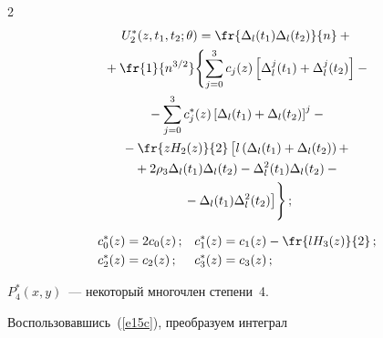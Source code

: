 \begin{multicols}{2}
\begin{multline*}
U_2^*(z,t_1,t_2;\theta)=\fr{\Delta_l(t_1)\Delta_l(t_2)}{n} +{}\\


{}+


        \fr{1}{n^{3/2}} \Biggl\{


        \sum_{j=0}^3 c_j(z)


        \left[\Delta_l^j(t_1)+\Delta_l^j(t_2)\right]-


{}\\


{}  -\sum_{j=0}^3 c_j^*(z)


        \left[


        \Delta_l(t_1)+\Delta_l(t_2)\right]^j-{}\\


        {}- \fr{zH_2(z)}{2}


         \left[\vphantom{\Delta^2_l}


          l\left(\Delta_l(t_1)+\Delta_l(t_2) \right)+\right.{}\\


{}        + 2\rho_3\Delta_l(t_1)\Delta_l(t_2)-\Delta_l^2(t_1)\Delta_l(t_2)-{}\\


\left. {}-


        \Delta_l(t_1)\Delta_l^2(t_2)\right] \Biggr\}\,;


   \end{multline*}


   


   \vspace*{-12pt}


   


   \noindent


   \begin{align*} 


c_0^*(z)&=2c_0(z)\,; & c_1^*(z)&=c_1(z)-\fr{l H_3(z)}{2}\,;\\


c_2^*(z)&=c_2(z)\,; &c_3^*(z)&=c_3(z)\,;


\end{align*}


   $P_4^*(x,y)$~--- некоторый многочлен степени~4.





   Воспользовавшись~(\ref{e15c}), преобразуем интеграл


   \begin{multline*} 



\end{multline*}
\end{multicols}

